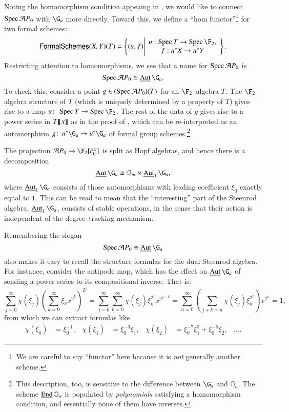 \begin{example}\label{FirstAppearanceOfInternalAut}
Noting the homomorphism condition appeaing in , we would like to connect $\operatorname{Spec} \mathcal AP_0$ with $\G_a$ more directly.  Toward this, we define a ``hom functor''\footnote{We are careful to say ``functor'' here because it is \emph{not} generally another scheme.} for two formal schemes: \[\InternalHom{FormalSchemes}(X, Y)(T) = \left\{ (u, f) \middle| \begin{array}{c} u: \Spec T \to \Spec \F_2, \\ f: u^* X \to u^* Y \end{array}\right\}.\]  Restricting attention to homomorphisms, we see that a name for $\operatorname{Spec} \mathcal AP_0$ is \[\Spec \mathcal AP_0 \cong \InternalAut \G_a.\]  To check this, consider a point $g \in (\operatorname{Spec} \mathcal AP_0)(T)$ for an $\F_2$--algebra $T$.  The $\F_2$--algebra structure of $T$ (which is uniquely determined by a property of $T$) gives rise to a map $u\co \Spec T \to \Spec \F_2$.  The rest of the data of $g$ gives rise to a power series in $T\llbracket{x}\rrbracket$ as in the proof of , which can be re-interpreted as an automorphism $g\co u^* \G_a \to u^* \G_a$ of formal group schemes.\footnote{This description, too, is sensitive to the difference between $\G_a$ and $\mathbb G_a$.  The scheme $\operatorname{\underline{\smash{\operatorname{End}}}} \mathbb G_a$ is populated by \emph{polynomials} satisfying a homomorphism condition, and essentially none of them have inverses.}
\end{example}

\begin{remark}\label{AutGaHasStableCoopns}
The projection $\mathcal AP_0 \to \F_2[\xi_0^\pm]$ is split as Hopf algebras, and hence there is a decomposition \[\InternalAut \G_a \cong \Gm \times \InternalAut_1 \G_a,\] where $\InternalAut_1 \G_a$ consists of those automorphisms with leading coefficient $\xi_0$ exactly equal to $1$.  This can be read to mean that the ``interesting'' part of the Steenrod algebra, $\InternalAut_1 \G_a$, consists of stable operations, in the sense that their action is independent of the degree--tracking mechanism.
\end{remark}

\begin{example}
Remembering the slogan \[\Spec \mathcal AP_0 \cong \InternalAut \G_a\] also makes it easy to recall the structure formulas for the dual Steenrod algebra.  For instance, consider the antipode map, which has the effect on $\InternalAut \G_a$ of sending a power series to its compositional inverse.  That is: \[\sum_{j=0}^\infty \chi(\xi_j) \left( \sum_{k=0}^\infty \xi_k x^{2^k} \right)^{2^j} = \sum_{j=0}^\infty \sum_{k=0}^\infty \chi(\xi_j) \xi_k^{2^j} x^{2^{j+k}} = \sum_{n=0}^\infty \left( \sum_{j+k=n} \chi(\xi_j) \xi_k^{2^j} \right) x^{2^n} = 1,\] from which we can extract formulas like
\begin{align*}
\chi(\xi_0) & = \xi_0^{-1}, &
\chi(\xi_1) & = \xi_0^{-3} \xi_1, &
\chi(\xi_2) & = \xi_0^{-7} \xi_1^3 + \xi_0^{-5} \xi_2, &
\ldots.
\end{align*}
\end{example}

